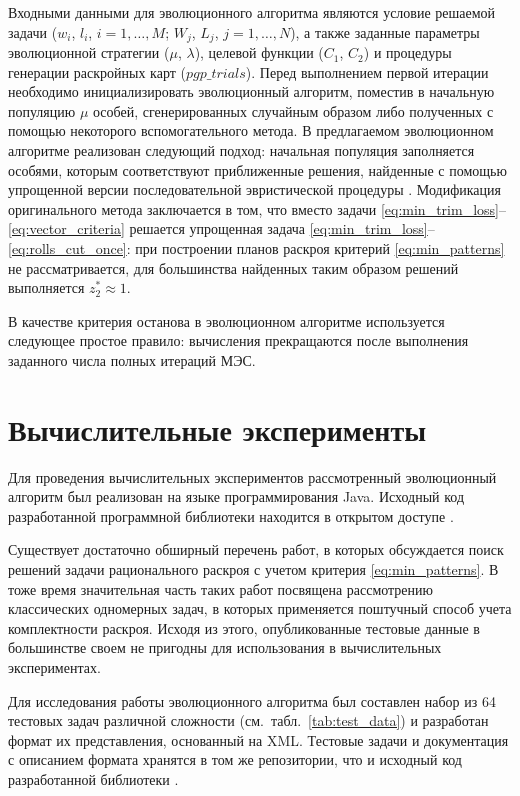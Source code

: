 \documentclass[12pt]{article}
\begin{document}
Входными данными для эволюционного алгоритма являются условие решаемой задачи 
($w_i$, $l_i$, $i=1,\ldots,M$; $W_j$, $L_j$, $j=1,\ldots,N$), а также заданные 
параметры эволюционной стратегии ($\mu$, $\lambda$), целевой функции 
($C_1$, $C_2$) и процедуры генерации раскройных карт ($pgp\_trials$). Перед 
выполнением первой итерации необходимо инициализировать эволюционный алгоритм, 
поместив в начальную популяцию $\mu$ особей, сгенерированных случайным образом 
либо полученных с помощью некоторого вспомогательного метода. В предлагаемом 
эволюционном алгоритме реализован следующий подход: начальная популяция 
заполняется особями, которым соответствуют приближенные решения, найденные 
с помощью упрощенной версии последовательной эвристической процедуры 
\cite{bib:haessler88}. 
Модификация оригинального метода 
\cite{bib:haessler88} 
заключается в том, что вместо задачи 
\eqref{eq:min_trim_loss}--\eqref{eq:vector_criteria} 
решается упрощенная задача 
\eqref{eq:min_trim_loss}--\eqref{eq:rolls_cut_once}: 
при построении планов раскроя 
критерий 
\eqref{eq:min_patterns} 
не рассматривается, для большинства найденных таким образом 
решений выполняется $z_2^* \approx 1$.

В качестве критерия останова в эволюционном алгоритме используется следующее 
простое правило: вычисления прекращаются после выполнения заданного числа 
полных итераций МЭС.


\section{Вычислительные эксперименты}

Для проведения вычислительных экспериментов рассмотренный эволюционный 
алгоритм был реализован на языке программирования Java. Исходный код 
разработанной программной библиотеки находится в открытом доступе
\cite{bib:github}.

Существует достаточно обширный перечень работ, в которых обсуждается поиск 
решений задачи рационального раскроя с учетом критерия 
\eqref{eq:min_patterns}. 
В тоже время 
значительная часть таких работ посвящена рассмотрению классических одномерных 
задач, в которых применяется поштучный способ учета комплектности раскроя. 
Исходя из этого, опубликованные тестовые данные в большинстве своем не 
пригодны для использования в вычислительных экспериментах.

Для исследования работы эволюционного алгоритма был составлен набор из 64 
тестовых задач различной сложности 
(см.~табл.~\ref{tab:test_data}) 
и разработан формат их 
представления, основанный на XML. Тестовые задачи и документация с описанием 
формата хранятся в том же репозитории, что и исходный код разработанной 
библиотеки 
\cite{bib:github}.
\end{document}

